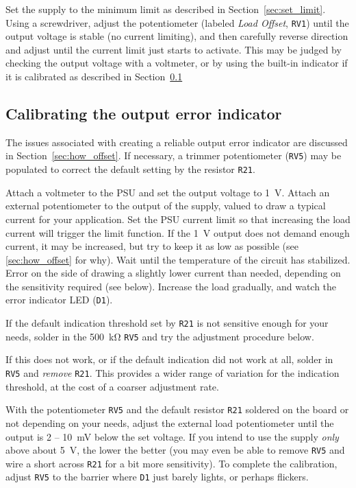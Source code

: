\documentclass[letterpaper,twocolumn,11pt]{article}
\newcommand{\refdes}[1]{\texttt{#1}}
\begin{document}
Set the supply to the minimum limit as described in Section~\ref{sec:set_limit}.
Using a screwdriver, adjust the potentiometer (labeled \emph{Load
Offset}, \refdes{RV1}) until the output voltage is stable (no current limiting),
and then carefully reverse direction and adjust until the current limit just
starts to activate. This may be judged by checking the output voltage with a
voltmeter, or by using the built-in indicator if it is calibrated as described
in Section~\ref{sec:cal_offset}

\subsection{Calibrating the output error indicator}\label{sec:cal_offset}

The issues associated with creating a reliable output error indicator are
discussed in Section~\ref{sec:how_offset}. If necessary, a trimmer potentiometer
(\refdes{RV5}) may be populated to correct the default setting by the resistor
\refdes{R21}.

Attach a voltmeter to the PSU and set the output voltage to \SI{1}{\V}. Attach
an external potentiometer to the output of the supply, valued to draw a typical
current for your application. Set the PSU current limit so that increasing the
load current will trigger the limit function. If the \SI{1}{\V} output does not
demand enough current, it may be increased, but try to keep it as low as
possible (see \ref{sec:how_offset} for why). Wait until the temperature of the
circuit has stabilized. Error on the side of drawing a slightly lower current
than needed, depending on the sensitivity required (see below). Increase the
load gradually, and watch the error indicator LED (\refdes{D1}).

If the default indication threshold set by \refdes{R21} is not sensitive enough
for your needs, solder in the \SI{500}{\kohm} \refdes{RV5} and try the
adjustment procedure below.

If this does not work, or if the default indication did not work at all, solder
in \refdes{RV5} and \emph{remove} \refdes{R21}. This provides a wider range of
variation for the indication threshold, at the cost of a coarser adjustment
rate.

With the potentiometer \refdes{RV5} and the default resistor \refdes{R21}
soldered on the board or not depending on your needs, adjust the external load
potentiometer until the output is 2 -- \SI{10}{\mV} below the set voltage. If
you intend to use the supply \emph{only} above about \SI{5}{\V}, the lower the
better (you may even be able to remove \refdes{RV5} and wire a short across
\refdes{R21} for a bit more sensitivity). To complete the calibration, adjust
\refdes{RV5} to the barrier where \refdes{D1} just barely lights, or perhaps
flickers.
\end{document}
